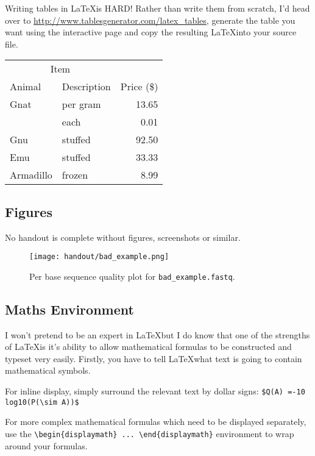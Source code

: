 Writing tables in \LaTeX is HARD! Rather than write them from scratch, I'd head over to
\url{http://www.tablesgenerator.com/latex_tables}, generate the table you want using the interactive
page and copy the resulting \LaTeX into your source file.

\begin{tabular}{llr}
\hline
\multicolumn{2}{c}{Item} \\
\cline{1-2}
Animal    & Description & Price (\$) \\
\hline
Gnat      & per gram    & 13.65      \\
          & each        & 0.01       \\
Gnu       & stuffed     & 92.50      \\
Emu       & stuffed     & 33.33      \\
Armadillo & frozen      & 8.99       \\
\hline
\end{tabular}

\subsection{Figures}

No handout is complete without figures, screenshots or similar.

\begin{figure}[H]
\centering
\texttt{[image: handout/bad\_example.png]}
\caption{Per base sequence quality plot for \texttt{bad\_example.fastq}.}
\label{fig:bad_example_untrimmed_plot}
\end{figure}

\subsection{Maths Environment}

I won't pretend to be an expert in \LaTeX but I do know that one of the strengths of \LaTeX is it's
ability to allow mathematical formulas to be constructed and typeset very easily. Firstly, you have
to tell \LaTeX what text is going to contain mathematical symbols.

For inline display, simply surround the relevant text by dollar signs: \verb+$Q(A) =-10 log10(P(\sim A))$+

For more complex mathematical formulas which need to be displayed separately, use the
\verb+\begin{displaymath} ... \end{displaymath}+ environment to wrap around your formulas.

